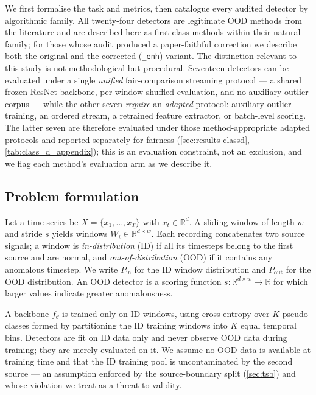 \documentclass[11pt]{article}
\begin{document}
We first formalise the task and metrics, then catalogue every audited detector by
algorithmic family. All twenty-four detectors are legitimate OOD methods from the
literature and are described here as first-class methods within their natural
family; for those whose audit produced a paper-faithful correction we describe both
the original and the corrected (\texttt{\_enh}) variant. The distinction relevant to
this study is not methodological but procedural. Seventeen detectors can be evaluated
under a single \emph{unified} fair-comparison streaming protocol --- a shared frozen
ResNet backbone, per-window shuffled evaluation, and no auxiliary outlier corpus ---
while the other seven \emph{require} an \emph{adapted} protocol: auxiliary-outlier
training, an ordered stream, a retrained feature extractor, or batch-level scoring.
The latter seven are therefore evaluated under those method-appropriate adapted
protocols and reported separately for fairness (\cref{sec:results-classd},
\cref{tab:class_d_appendix}); this is an evaluation constraint, not an exclusion, and
we flag each method's evaluation arm as we describe it.

\subsection{Problem formulation}\label{sec:problem}

Let a time series be $X = \{x_1, \dots, x_T\}$ with $x_t \in \mathbb{R}^{d}$. A
sliding window of length $w$ and stride $s$ yields windows $W_i \in \mathbb{R}^{d
\times w}$. Each recording concatenates two source signals; a window is
\emph{in-distribution} (ID) if all its timesteps belong to the first source and are
normal, and \emph{out-of-distribution} (OOD) if it contains any anomalous timestep.
We write $P_{\mathrm{in}}$ for the ID window distribution and $P_{\mathrm{out}}$ for
the OOD distribution. An OOD detector is a scoring function $s : \mathbb{R}^{d
\times w} \to \mathbb{R}$ for which larger values indicate greater anomalousness.

A backbone $f_\theta$ is trained only on ID windows, using cross-entropy over $K$
pseudo-classes formed by partitioning the ID training windows into $K$ equal temporal
bins. Detectors are fit on ID data only and never observe OOD data during training;
they are merely evaluated on it. We assume no OOD data is available at training time
and that the ID training pool is uncontaminated by the second source --- an
assumption enforced by the source-boundary split (\cref{sec:tsb}) and whose
violation we treat as a threat to validity.
\end{document}
